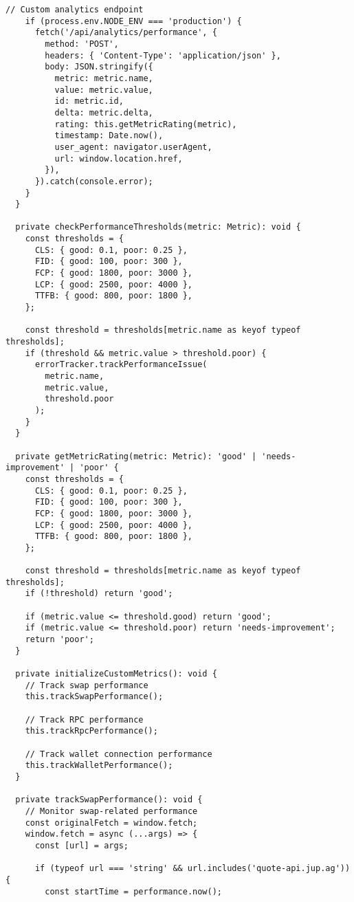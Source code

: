 \documentclass[11pt,a4paper]{article}
\begin{document}
\begin{lstlisting}[style=javascript, caption=Web Vitals Performance Monitoring]
    // Custom analytics endpoint
    if (process.env.NODE_ENV === 'production') {
      fetch('/api/analytics/performance', {
        method: 'POST',
        headers: { 'Content-Type': 'application/json' },
        body: JSON.stringify({
          metric: metric.name,
          value: metric.value,
          id: metric.id,
          delta: metric.delta,
          rating: this.getMetricRating(metric),
          timestamp: Date.now(),
          user_agent: navigator.userAgent,
          url: window.location.href,
        }),
      }).catch(console.error);
    }
  }
  
  private checkPerformanceThresholds(metric: Metric): void {
    const thresholds = {
      CLS: { good: 0.1, poor: 0.25 },
      FID: { good: 100, poor: 300 },
      FCP: { good: 1800, poor: 3000 },
      LCP: { good: 2500, poor: 4000 },
      TTFB: { good: 800, poor: 1800 },
    };
    
    const threshold = thresholds[metric.name as keyof typeof thresholds];
    if (threshold && metric.value > threshold.poor) {
      errorTracker.trackPerformanceIssue(
        metric.name,
        metric.value,
        threshold.poor
      );
    }
  }
  
  private getMetricRating(metric: Metric): 'good' | 'needs-improvement' | 'poor' {
    const thresholds = {
      CLS: { good: 0.1, poor: 0.25 },
      FID: { good: 100, poor: 300 },
      FCP: { good: 1800, poor: 3000 },
      LCP: { good: 2500, poor: 4000 },
      TTFB: { good: 800, poor: 1800 },
    };
    
    const threshold = thresholds[metric.name as keyof typeof thresholds];
    if (!threshold) return 'good';
    
    if (metric.value <= threshold.good) return 'good';
    if (metric.value <= threshold.poor) return 'needs-improvement';
    return 'poor';
  }
  
  private initializeCustomMetrics(): void {
    // Track swap performance
    this.trackSwapPerformance();
    
    // Track RPC performance
    this.trackRpcPerformance();
    
    // Track wallet connection performance
    this.trackWalletPerformance();
  }
  
  private trackSwapPerformance(): void {
    // Monitor swap-related performance
    const originalFetch = window.fetch;
    window.fetch = async (...args) => {
      const [url] = args;
      
      if (typeof url === 'string' && url.includes('quote-api.jup.ag')) {
        const startTime = performance.now();
        

\end{lstlisting}
\end{document}
